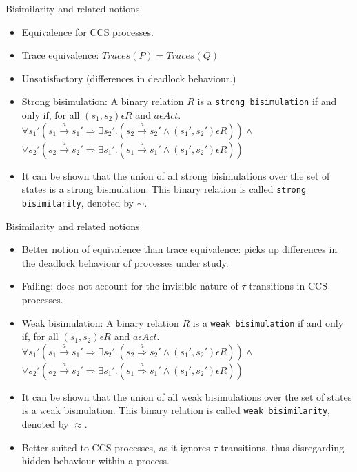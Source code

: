 \documentclass{beamer}
\begin{document}
\begin{frame}{Bisimilarity and related notions}
  \begin{itemize}
  \item Equivalence for CCS
    processes.
  \item Trace equivalence: $Traces(P) = Traces(Q)$
  \item Unsatisfactory (differences in deadlock
    behaviour.)
  \item Strong bisimulation: A binary relation $R$ is a \texttt{strong
    bisimulation} if and only if, for all $(s_1, s_2) \epsilon R$ and $a \epsilon Act .$\\
    $\forall s_1' (s_1 \xrightarrow{a} s_1' \Rightarrow \exists s_2'
    . (s_2 \xrightarrow{a} s_2' \wedge (s_1', s_2') \epsilon R ) )
    \wedge $ \\
    $\forall s_2' (s_2 \xrightarrow{a} s_2' \Rightarrow \exists s_1'
    . (s_1 \xrightarrow{a} s_1' \wedge (s_1', s_2') \epsilon R ) )$
  \item It can be shown that the union of all strong bisimulations
    over the set of states is a strong bismulation. This binary
    relation is called \texttt{strong bisimilarity}, denoted by $\sim$.
  \end{itemize}
\end{frame}

\begin{frame}{Bisimilarity and related notions}
  \begin{itemize}
  \item Better notion of equivalence than trace
    equivalence: picks up differences in the deadlock
    behaviour of processes under study.
  \item Failing: does not account for the
    invisible nature of $\tau$ transitions in CCS processes.
  \item Weak bisimulation: A binary relation $R$ is a \texttt{weak
    bisimulation} if and only if, for all $(s_1, s_2) \epsilon R$ and $a \epsilon Act .$\\
    $\forall s_1' (s_1 \xrightarrow{a} s_1' \Rightarrow \exists s_2'
    . (s_2 \overset{a}{\Rightarrow} s_2' \wedge (s_1', s_2') \epsilon R ) )
    \wedge $ \\
    $\forall s_2' (s_2 \xrightarrow{a} s_2' \Rightarrow \exists s_1'
    . (s_1 \overset{a}{\Rightarrow} s_1' \wedge (s_1', s_2') \epsilon R ) )$
  \item It can be shown that the union of all weak bisimulations
    over the set of states is a weak bismulation. This binary
    relation is called \texttt{weak bisimilarity}, denoted by $\approx$.
  \item Better suited to CCS processes,
    as it ignores $\tau$ transitions, thus disregarding hidden
    behaviour within a process.
  \end{itemize}
\end{frame}
\end{document}
